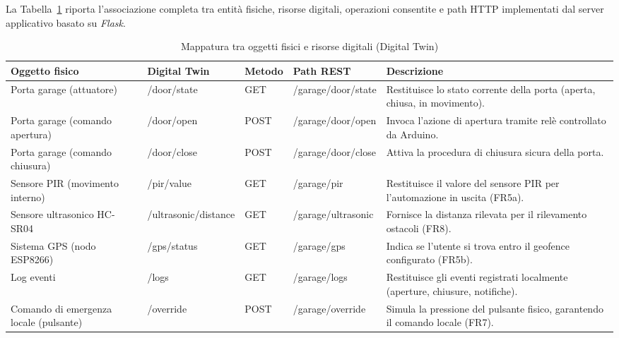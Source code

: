 La Tabella~\ref{tab:digital_twins} riporta l’associazione completa tra entità fisiche, risorse digitali, operazioni consentite e path HTTP implementati dal server applicativo basato su \textit{Flask}.

\begin{table}[H]
\centering
\caption{Mappatura tra oggetti fisici e risorse digitali (Digital Twin)}
\label{tab:digital_twins}
\begin{tabularx}{\textwidth}{@{}p{3cm} l l l X@{}}
\toprule
\textbf{Oggetto fisico} & \textbf{Digital Twin} & \textbf{Metodo} & \textbf{Path REST} & \textbf{Descrizione} \\
\midrule

Porta garage (attuatore) 
& /door/state 
& GET 
& /garage/door/state 
& Restituisce lo stato corrente della porta (aperta, chiusa, in movimento). \\

Porta garage (comando apertura) 
& /door/open 
& POST 
& /garage/door/open 
& Invoca l’azione di apertura tramite relè controllato da Arduino. \\

Porta garage (comando chiusura) 
& /door/close 
& POST 
& /garage/door/close 
& Attiva la procedura di chiusura sicura della porta. \\

Sensore PIR (movimento interno) 
& /pir/value 
& GET 
& /garage/pir 
& Restituisce il valore del sensore PIR per l’automazione in uscita (FR5a). \\

Sensore ultrasonico HC-SR04 
& /ultrasonic/distance 
& GET 
& /garage/ultrasonic 
& Fornisce la distanza rilevata per il rilevamento ostacoli (FR8). \\

Sistema GPS (nodo ESP8266) 
& /gps/status 
& GET 
& /garage/gps 
& Indica se l’utente si trova entro il geofence configurato (FR5b). \\

Log eventi 
& /logs 
& GET 
& /garage/logs 
& Restituisce gli eventi registrati localmente (aperture, chiusure, notifiche). \\

Comando di emergenza locale (pulsante) 
& /override 
& POST 
& /garage/override 
& Simula la pressione del pulsante fisico, garantendo il comando locale (FR7). \\

\bottomrule
\end{tabularx}
\end{table}

